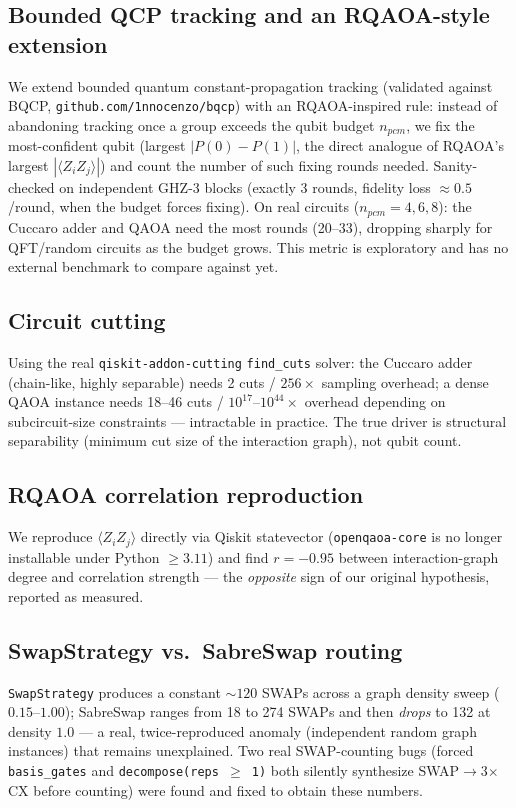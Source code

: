 \documentclass[9pt,twocolumn]{extarticle}
\begin{document}
\subsection{Bounded QCP tracking and an RQAOA-style extension}
We extend bounded quantum constant-propagation tracking (validated against
BQCP, \texttt{github.com/1nnocenzo/bqcp}) with an RQAOA-inspired rule:
instead of abandoning tracking once a group exceeds the qubit budget
$n_{pcm}$, we fix the most-confident qubit (largest $|P(0)-P(1)|$, the direct
analogue of RQAOA's largest $|\langle Z_iZ_j\rangle|$) and count the number
of such fixing rounds needed. Sanity-checked on independent GHZ-3 blocks
(exactly 3 rounds, fidelity loss $\approx 0.5$/round, when the budget forces
fixing). On real circuits ($n_{pcm}=4,6,8$): the Cuccaro adder and QAOA need
the most rounds (20--33), dropping sharply for QFT/random circuits as the
budget grows. This metric is exploratory and has no external benchmark to
compare against yet.

\subsection{Circuit cutting}
Using the real \texttt{qiskit-addon-cutting} \texttt{find\_cuts} solver: the
Cuccaro adder (chain-like, highly separable) needs 2 cuts / $256\times$
sampling overhead; a dense QAOA instance needs 18--46 cuts /
$10^{17}$--$10^{44}\times$ overhead depending on subcircuit-size constraints
--- intractable in practice. The true driver is structural separability
(minimum cut size of the interaction graph), not qubit count.

\subsection{RQAOA correlation reproduction}
We reproduce $\langle Z_iZ_j\rangle$ directly via Qiskit statevector
(\texttt{openqaoa-core} is no longer installable under Python $\ge 3.11$) and
find $r=-0.95$ between interaction-graph degree and correlation strength ---
the \emph{opposite} sign of our original hypothesis, reported as measured.

\subsection{SwapStrategy vs.\ SabreSwap routing}
\texttt{SwapStrategy} produces a constant $\sim120$ SWAPs across a graph
density sweep ($0.15$--$1.00$); SabreSwap ranges from 18 to 274 SWAPs and then
\emph{drops} to 132 at density $1.0$ --- a real, twice-reproduced anomaly
(independent random graph instances) that remains unexplained. Two real
SWAP-counting bugs (forced \texttt{basis\_gates} and \texttt{decompose(reps
$\ge$ 1)} both silently synthesize SWAP$\to$3$\times$CX before counting) were
found and fixed to obtain these numbers.
\end{document}
